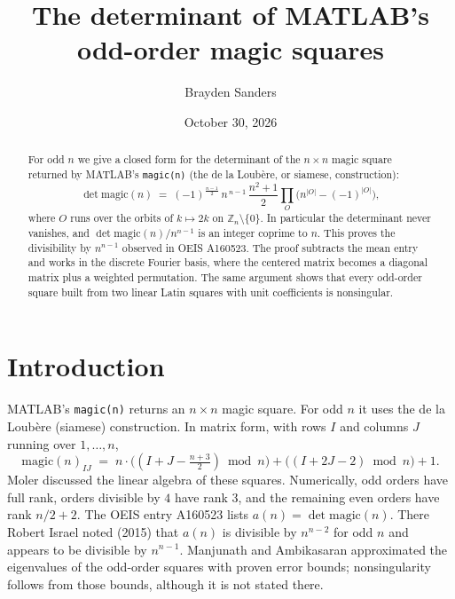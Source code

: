 \documentclass[11pt]{amsart}
\title{The determinant of MATLAB's odd-order magic squares}
\author{Brayden Sanders}
\date{October 30, 2026}
\theoremstyle{remark}
\newcommand{\Z}{\mathbb{Z}}
\begin{document}
\begin{abstract}
For odd $n$ we give a closed form for the determinant of the $n\times n$ magic square returned by MATLAB's
\texttt{magic(n)} (the de la Loub\`ere, or siamese, construction):
\[
\det \mathrm{magic}(n) \;=\; (-1)^{\frac{n-1}{2}}\, n^{\,n-1}\,\frac{n^2+1}{2}\prod_{O}\bigl(n^{|O|}-(-1)^{|O|}\bigr),
\]
where $O$ runs over the orbits of $k\mapsto 2k$ on $\Z_n\setminus\{0\}$. In particular the determinant never
vanishes, and $\det\mathrm{magic}(n)/n^{n-1}$ is an integer coprime to $n$. This proves the divisibility by $n^{n-1}$
observed in OEIS A160523. The proof subtracts the mean entry and works in the discrete Fourier basis, where the
centered matrix becomes a diagonal matrix plus a weighted permutation. The same argument shows that every odd-order
square built from two linear Latin squares with unit coefficients is nonsingular.
\end{abstract}

\maketitle

\section{Introduction}

MATLAB's \texttt{magic(n)} returns an $n\times n$ magic square. For odd $n$ it uses the de la Loub\`ere (siamese)
construction. In matrix form, with rows $I$ and columns $J$ running over $1,\dots,n$,
\[
\mathrm{magic}(n)_{IJ} \;=\; n\cdot\bigl((I+J-\tfrac{n+3}{2}) \bmod n\bigr)+\bigl((I+2J-2)\bmod n\bigr)+1 .
\]
Moler \cite{moler} discussed the linear algebra of these squares. Numerically, odd orders have full rank, orders
divisible by $4$ have rank $3$, and the remaining even orders have rank $n/2+2$. The OEIS entry A160523 \cite{oeis}
lists $a(n)=\det\mathrm{magic}(n)$. There Robert Israel noted (2015) that $a(n)$ is divisible by $n^{n-2}$ for odd
$n$ and appears to be divisible by $n^{n-1}$. Manjunath and Ambikasaran \cite{ma} approximated the eigenvalues of
the odd-order squares with proven error bounds; nonsingularity follows from those bounds, although it is not stated
there.
\end{document}
